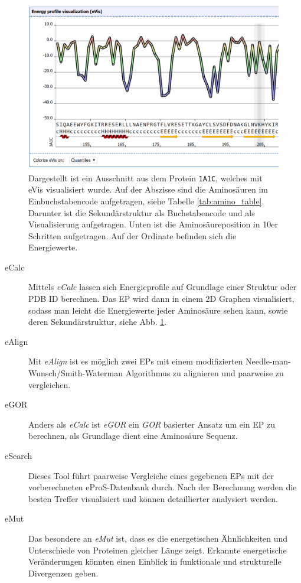 \begin{figure}
\includegraphics[width=.95\textwidth]{images/ePros.png}
\caption{Dargestellt ist ein Ausschnitt aus dem Protein \texttt{1A1C}, welches mit \ac{eVis} visualisiert wurde. Auf der Abszisse sind die Aminosäuren im Einbuchstabencode aufgetragen, siehe Tabelle \ref{tab:amino_table}. Darunter ist die Sekundärstruktur als Buchstabencode und als Visualisierung aufgetragen. Unten ist die Aminosäureposition in 10er Schritten aufgetragen. Auf der Ordinate befinden sich die Energiewerte.}
\label{fig:epros}
\end{figure}

\begin{description}
\item[eCalc]
Mittels \emph{eCalc} lassen sich Energieprofile auf Grundlage einer Struktur oder \ac{PDB} ID berechnen. Das EP wird dann in einem 2D Graphen visualisiert, sodass man leicht die Energiewerte jeder Aminosäure sehen kann, sowie deren Sekundärstruktur, siehe Abb. \ref{fig:epros}.
\item[eAlign]
Mit \emph{eAlign} ist es möglich zwei EPs mit einem modifizierten Needle-man-Wunsch/Smith-Waterman Algorithmus zu alignieren und paarweise zu vergleichen.
\item[eGOR]
Anders als \emph{eCalc} ist \emph{eGOR} ein \emph{GOR}\cite{Garnier.1996} basierter Ansatz um ein EP zu berechnen, als Grundlage dient eine Aminosäure Sequenz.
\item[eSearch]
Dieses Tool führt paarweise Vergleiche eines gegebenen EPs mit der vorberechneten eProS-Datenbank durch. Nach der Berechnung werden die besten Treffer visualisiert und können detaillierter analysiert werden.
\item[eMut]
Das besondere an \emph{eMut} ist, dass es die energetischen Ähnlichkeiten und Unterschiede von Proteinen gleicher Länge zeigt. Erkannte energetische Veränderungen könnten einen Einblick in funktionale und strukturelle Divergenzen geben.
\end{description}


